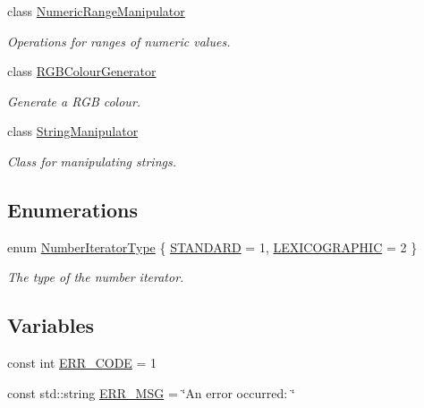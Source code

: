 \begin{DoxyCompactItemize}
class \hyperlink{classmultiscale_1_1NumericRangeManipulator}{Numeric\-Range\-Manipulator}
\begin{DoxyCompactList}\small\item\em Operations for ranges of numeric values. \end{DoxyCompactList}\item 
class \hyperlink{classmultiscale_1_1RGBColourGenerator}{R\-G\-B\-Colour\-Generator}
\begin{DoxyCompactList}\small\item\em Generate a R\-G\-B colour. \end{DoxyCompactList}\item 
class \hyperlink{classmultiscale_1_1StringManipulator}{String\-Manipulator}
\begin{DoxyCompactList}\small\item\em Class for manipulating strings. \end{DoxyCompactList}\end{DoxyCompactItemize}
\subsection*{Enumerations}
\begin{DoxyCompactItemize}
\item 
enum \hyperlink{namespacemultiscale_a6ef911f4d48a4bf5e657c237ec169ff5}{Number\-Iterator\-Type} \{ \hyperlink{namespacemultiscale_a6ef911f4d48a4bf5e657c237ec169ff5aa048887eb0360a4b70dff5452133f42e}{S\-T\-A\-N\-D\-A\-R\-D} = 1, 
\hyperlink{namespacemultiscale_a6ef911f4d48a4bf5e657c237ec169ff5a2cba3a0174cc5c1d555ee13dcf6cda15}{L\-E\-X\-I\-C\-O\-G\-R\-A\-P\-H\-I\-C} = 2
 \}
\begin{DoxyCompactList}\small\item\em The type of the number iterator. \end{DoxyCompactList}\end{DoxyCompactItemize}
\subsection*{Variables}
\begin{DoxyCompactItemize}
\item 
const int \hyperlink{namespacemultiscale_a4ee40795105048ee371efeeb7962ecf6}{E\-R\-R\-\_\-\-C\-O\-D\-E} = 1
\item 
const std\-::string \hyperlink{namespacemultiscale_a06490e4e11ef359aa0260f96579ce584}{E\-R\-R\-\_\-\-M\-S\-G} = \char`\"{}An error occurred\-: \char`\"{}
\end{DoxyCompactItemize}


